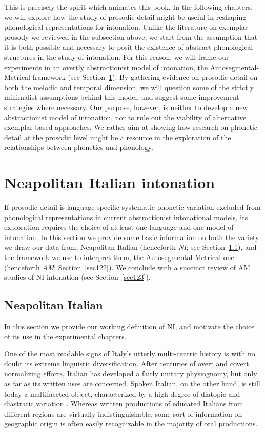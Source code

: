 This is precisely the spirit which animates this book. In the following chapters, we will explore how the study of prosodic detail might be useful in reshaping phonological representations for intonation. Unlike the literature on exemplar prosody we reviewed in the subsection above, we start from the assumption that it is both possible and necessary to posit the existence of abstract phonological structures in the study of intonation. For this reason, we will frame our experiments in an overtly abstractionist model of intonation, the Autosegmental-Metrical framework (see Section~\ref{sec12}). By gathering evidence on prosodic detail on both the melodic and temporal dimension, we will question some of the strictly minimalist assumptions behind this model, and suggest some improvement strategies where necessary. Our purpose, however, is neither to develop a new abstractionist model of intonation, nor to rule out the viability of alternative exemplar-based approaches. We rather aim at showing how research on phonetic detail at the prosodic level might be a resource in the exploration of the relationships between phonetics and phonology.

\section{Neapolitan Italian intonation}\label{sec12}
If prosodic detail is language-specific systematic phonetic variation excluded from phonological representations in current abstractionist intonational models, its exploration requires the choice of at least one language and one model of intonation. In this section we provide some basic information on both the variety we draw our data from, Neapolitan Italian (henceforth \textit{NI}; see Section~\ref{sec121}), and the framework we use to interpret them, the Autosegmental-Metrical one (henceforth \textit{AM}; Section~\ref{sec122}). We conclude with a succinct review of AM studies of NI intonation (see Section~\ref{sec123}).

\subsection{Neapolitan Italian}\label{sec121}
In this section we provide our working definition of NI, and motivate the choice of its use in the experimental chapters.

One of the most readable signs of Italy's utterly multi-centric history is with no doubt its extreme linguistic diversification. After centuries of overt and covert normalizing efforts, Italian has developed a fairly unitary physiognomy, but only as far as its written uses are concerned. Spoken Italian, on the other hand, is still today a multifaceted object, characterized by a high degree of diatopic and diastratic variation \citep{demauro1970storia}. Whereas written productions of educated Italians from different regions are virtually indistinguishable, some sort of information on geographic origin is often easily recognizable in the majority of oral productions. 

